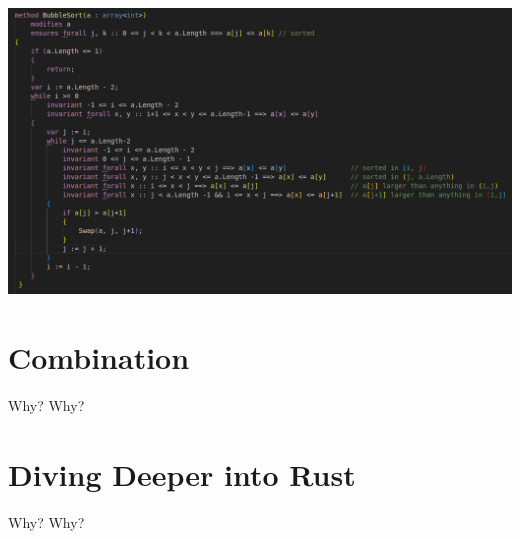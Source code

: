 \documentclass{beamer}
\begin{document}
\begin{frame}
\begin{center}
\includegraphics[scale=0.3]{pictures/verification/bubblesort_annotated.png}
\end{center}
\end{frame}




\section{Combination}
\begin{frame}{Why?}
Why? 
\end{frame}

\section{Diving Deeper into Rust}
\begin{frame}{Why?}
Why? 
\end{frame}
\end{document}
